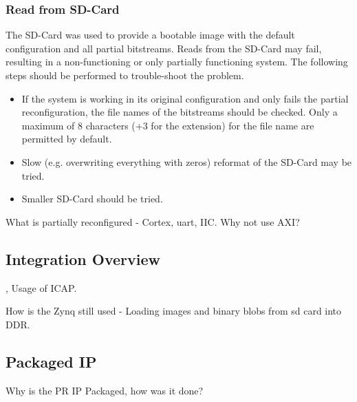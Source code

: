 \subsubsection{Read from SD-Card}
The SD-Card was used to provide a bootable image with the default configuration and all partial bitstreams.
Reads from the SD-Card may fail, resulting in a non-functioning or only partially functioning system.
The following steps should be performed to trouble-shoot the problem. 

\begin{itemize}
    \item If the system is working in its original configuration and only fails the partial reconfiguration, the file names of the bitstreams should be checked. Only a maximum of 8 characters (+3 for the extension) for the file name are permitted by default. 
    \item Slow (e.g. overwriting everything with zeros) reformat of the SD-Card may be tried.
    \item Smaller SD-Card should be tried.
\end{itemize}


What is partially reconfigured - Cortex, uart, IIC.
Why not use AXI?

\subsection{Integration Overview}
\cite{xilinx_vivado_2018-1}, \cite{xilinx_vivado_2018}
Usage of \gls{ICAP}.

How is the Zynq still used - Loading images and binary blobs from sd card into DDR.

\subsection{Packaged IP}
Why is the PR IP Packaged, how was it done? \cite{xilinx_ug1118-vivado-creating-packaging-custom-ip.pdf_nodate}
